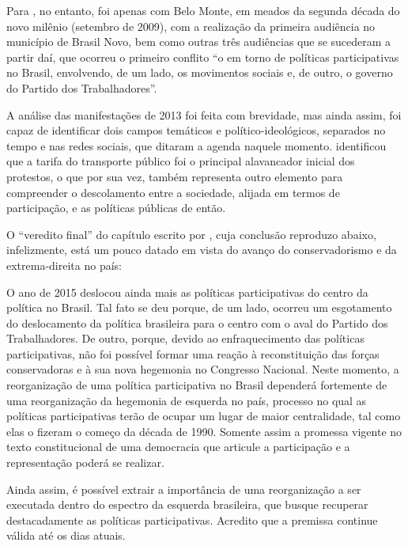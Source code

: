 \documentclass[
article,			%
11pt,				%
oneside,			%
a4paper,			%
english,			%
brazil,				%
sumario=tradicional
]{abntex2}
\begin{document}
	Para , no entanto, foi apenas com Belo Monte, em meados da segunda década do novo milênio (setembro de 2009), com a realização da primeira audiência no município de Brasil Novo, bem como outras três audiências que se sucederam a partir daí, que ocorreu o primeiro conflito ``o em torno de políticas participativas no Brasil, envolvendo, de um lado, os movimentos sociais e, de outro, o governo do Partido dos Trabalhadores''.
	
	A análise das manifestações de 2013 foi feita com brevidade, mas ainda assim, foi capaz de identificar dois campos temáticos e político-ideológicos, separados no tempo e nas redes sociais, que ditaram a agenda naquele momento.  identificou que a tarifa do transporte público foi o principal alavancador inicial dos protestos, o que por sua vez, também representa outro elemento para compreender o descolamento entre a sociedade, alijada em termos de participação, e as políticas públicas de então.
	
	O ``veredito final'' do capítulo escrito por , cuja conclusão reproduzo abaixo, infelizmente, está um pouco datado em vista do avanço do conservadorismo e da extrema-direita no país:
	
	\begin{citacao}
		O ano de 2015 deslocou ainda mais as políticas participativas do centro da política no Brasil. Tal fato se deu porque, de um lado, ocorreu um esgotamento do deslocamento da política brasileira para o centro com o aval do Partido dos Trabalhadores. De outro, porque, devido ao enfraquecimento das políticas participativas, não foi possível formar uma reação à reconstituição das forças conservadoras e à sua nova hegemonia no Congresso Nacional. Neste momento, a reorganização de uma política participativa no Brasil dependerá fortemente de uma reorganização da hegemonia de esquerda no país, processo no qual as políticas participativas terão de ocupar um lugar de maior centralidade, tal como elas o fizeram o começo da década de 1990. Somente assim a promessa vigente no texto constitucional de uma democracia que articule a participação e a representação poderá se realizar.
	\end{citacao}

	Ainda assim, é possível extrair a importância de uma reorganização a ser executada dentro do espectro da esquerda brasileira, que busque recuperar destacadamente as políticas participativas. Acredito que a premissa continue válida até os dias atuais.
\end{document}

